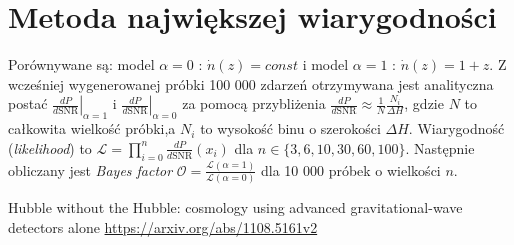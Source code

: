 \documentclass{article}
\begin{document}
\section{Metoda największej wiarygodności}
Porównywane są: model $\alpha=0$ : $\dot n (z)=const $ i model $\alpha=1$ : $\dot n (z)=1+z $. Z wcześniej wygenerowanej próbki 100 000 zdarzeń otrzymywana jest analityczna postać $\left.\frac{dP}{d\mbox{SNR}} \right |_{\alpha=1}$ i $\left.\frac{dP}{d\mbox{SNR}} \right |_{\alpha=0}$ za pomocą przybliżenia $\frac{dP}{d\mbox{SNR}}\approx\frac{1}{N}\frac{N_i}{\Delta H}$, gdzie $N$ to całkowita wielkość próbki,a $N_i$ to wysokość binu o szerokości $\Delta H$. Wiarygodność (\textit{likelihood}) to $\mathcal{L}=\prod_{i=0}^{n}\frac{dP}{d\mbox{SNR}}(x_i)$ dla $n\in\{3,6,10,30,60,100\}$. Następnie obliczany jest \textit{Bayes factor} $ \mathcal{O}=\frac{\mathcal{L}(\alpha =1)}{\mathcal{L}(\alpha =0)}$ dla 10 000 próbek o wielkości $n$.


\begin{thebibliography}{9}
Hubble without the Hubble: cosmology using advanced gravitational-wave detectors alone
\url{https://arxiv.org/abs/1108.5161v2}
\end{thebibliography}
\end{document}
